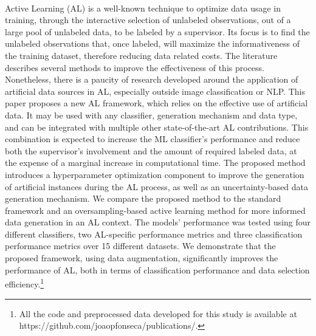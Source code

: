 ~\label{chp:active-learning-augmentation}
\graphicspath{{figures/active-learning-augmentation/}}

\begin{adjustwidth}{30pt}{30pt}

    Active Learning (AL) is a well-known technique to optimize data usage in
    training, through the interactive selection of unlabeled observations, out
    of a large pool of unlabeled data, to be labeled by a supervisor. Its
    focus is to find the unlabeled observations that, once labeled, will
    maximize the informativeness of the training dataset, therefore reducing
    data related costs. The literature describes several methods to improve
    the effectiveness of this process. Nonetheless, there is a paucity of
    research developed around the application of artificial data sources in
    AL, especially outside image classification or NLP. This paper
    proposes a new AL framework, which relies on the effective use of
    artificial data. It may be used with any classifier, generation mechanism
    and data type, and can be integrated with multiple other state-of-the-art
    AL contributions. This combination is expected to increase the ML
    classifier's performance and reduce both the supervisor's involvement and
    the amount of required labeled data, at the expense of a marginal increase
    in computational time. The proposed method introduces a
    hyperparameter optimization component to improve the generation of
    artificial instances during the AL process, as well as an
    uncertainty-based data generation mechanism. We compare the proposed
    method to the standard framework and an oversampling-based active
    learning method for more informed data generation in an AL context.
    The models' performance was tested using four different classifiers, two
    AL-specific performance metrics and three classification performance
    metrics over 15 different datasets. We demonstrate that the proposed
    framework, using data augmentation, significantly improves the performance
    of AL, both in terms of classification performance and data selection
    efficiency.\footnote{All the code and preprocessed data developed for
        this study is available at
        https://github.com/joaopfonseca/publications/.
    } 

\end{adjustwidth}

